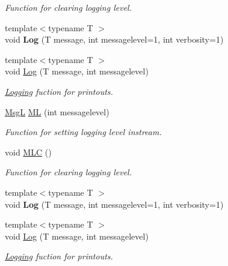 \begin{DoxyCompactItemize}
\begin{DoxyCompactList}\small\item\em Function for clearing logging level. \end{DoxyCompactList}\item 
\hypertarget{classTool_a46f7e599888302feefcf25e4f6cb4f9e}{{\footnotesize template$<$typename T $>$ }\\void {\bfseries Log} (T message, int messagelevel=1, int verbosity=1)}\label{classTool_a46f7e599888302feefcf25e4f6cb4f9e}

\item 
{\footnotesize template$<$typename T $>$ }\\void \hyperlink{classTool_ac65a2dfa2e3531fe8e05fe4112846fcf}{Log} (T message, int messagelevel)
\begin{DoxyCompactList}\small\item\em \hyperlink{classLogging}{Logging} fuction for printouts. \end{DoxyCompactList}\item 
\hyperlink{structMsgL}{Msg\-L} \hyperlink{classTool_aece350bc23e63656276b8338419dc54e}{M\-L} (int messagelevel)
\begin{DoxyCompactList}\small\item\em Function for setting logging level instream. \end{DoxyCompactList}\item 
\hypertarget{classTool_ae4da557812278419f6f8b8484df08115}{void \hyperlink{classTool_ae4da557812278419f6f8b8484df08115}{M\-L\-C} ()}\label{classTool_ae4da557812278419f6f8b8484df08115}

\begin{DoxyCompactList}\small\item\em Function for clearing logging level. \end{DoxyCompactList}\item 
\hypertarget{classTool_a46f7e599888302feefcf25e4f6cb4f9e}{{\footnotesize template$<$typename T $>$ }\\void {\bfseries Log} (T message, int messagelevel=1, int verbosity=1)}\label{classTool_a46f7e599888302feefcf25e4f6cb4f9e}

\item 
{\footnotesize template$<$typename T $>$ }\\void \hyperlink{classTool_ac65a2dfa2e3531fe8e05fe4112846fcf}{Log} (T message, int messagelevel)
\begin{DoxyCompactList}\small\item\em \hyperlink{classLogging}{Logging} fuction for printouts. \end{DoxyCompactList}\end{DoxyCompactItemize}
